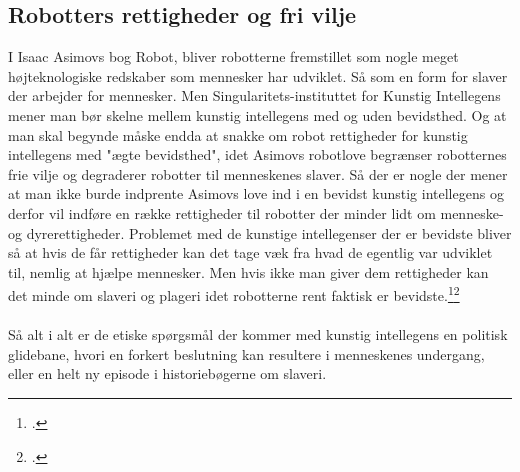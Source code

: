 \subsection{Robotters rettigheder og fri vilje}

I Isaac Asimovs bog Robot, bliver robotterne fremstillet som nogle meget højteknologiske redskaber som mennesker har udviklet. Så som en form for slaver der arbejder for mennesker.
Men Singularitets-instituttet for Kunstig Intellegens mener man bør skelne mellem kunstig intellegens med og uden bevidsthed. Og at man skal begynde måske endda at snakke om
robot rettigheder for kunstig intellegens med "ægte bevidsthed", idet Asimovs robotlove begrænser robotternes frie vilje og degraderer robotter til menneskenes slaver. Så der er
nogle der mener at man ikke burde indprente Asimovs love ind i en bevidst kunstig intellegens og derfor vil indføre en række rettigheder til robotter der minder lidt om
menneske- og dyrerettigheder. Problemet med de kunstige intellegenser der er bevidste bliver så at hvis de får rettigheder kan det tage væk fra hvad de egentlig var udviklet til,
nemlig at hjælpe mennesker. Men hvis ikke man giver dem rettigheder kan det minde om slaveri og plageri idet robotterne rent faktisk er bevidste.\footcite{etikr}\footcite{robri}
\\
\\
Så alt i alt er de etiske spørgsmål der kommer med kunstig intellegens en politisk glidebane, hvori en forkert beslutning kan resultere i menneskenes undergang, eller en helt
ny episode i historiebøgerne om slaveri.
